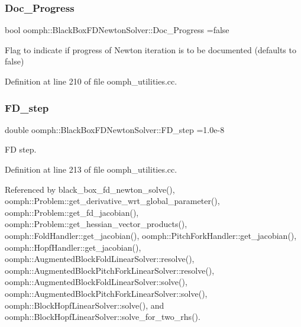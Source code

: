 \subsubsection{\texorpdfstring{Doc\+\_\+\+Progress}{Doc\_Progress}}
{\footnotesize\ttfamily bool oomph\+::\+Black\+Box\+F\+D\+Newton\+Solver\+::\+Doc\+\_\+\+Progress =false}



Flag to indicate if progress of Newton iteration is to be documented (defaults to false) 



Definition at line 210 of file oomph\+\_\+utilities.\+cc.

\mbox{\label{namespaceoomph_1_1BlackBoxFDNewtonSolver_a6f0d2ceb4451e66bb7ef4ab4fdb62bcf}} 
\subsubsection{\texorpdfstring{F\+D\+\_\+step}{FD\_step}}
{\footnotesize\ttfamily double oomph\+::\+Black\+Box\+F\+D\+Newton\+Solver\+::\+F\+D\+\_\+step =1.\+0e-\/8}



FD step. 



Definition at line 213 of file oomph\+\_\+utilities.\+cc.



Referenced by black\+\_\+box\+\_\+fd\+\_\+newton\+\_\+solve(), oomph\+::\+Problem\+::get\+\_\+derivative\+\_\+wrt\+\_\+global\+\_\+parameter(), oomph\+::\+Problem\+::get\+\_\+fd\+\_\+jacobian(), oomph\+::\+Problem\+::get\+\_\+hessian\+\_\+vector\+\_\+products(), oomph\+::\+Fold\+Handler\+::get\+\_\+jacobian(), oomph\+::\+Pitch\+Fork\+Handler\+::get\+\_\+jacobian(), oomph\+::\+Hopf\+Handler\+::get\+\_\+jacobian(), oomph\+::\+Augmented\+Block\+Fold\+Linear\+Solver\+::resolve(), oomph\+::\+Augmented\+Block\+Pitch\+Fork\+Linear\+Solver\+::resolve(), oomph\+::\+Augmented\+Block\+Fold\+Linear\+Solver\+::solve(), oomph\+::\+Augmented\+Block\+Pitch\+Fork\+Linear\+Solver\+::solve(), oomph\+::\+Block\+Hopf\+Linear\+Solver\+::solve(), and oomph\+::\+Block\+Hopf\+Linear\+Solver\+::solve\+\_\+for\+\_\+two\+\_\+rhs().

